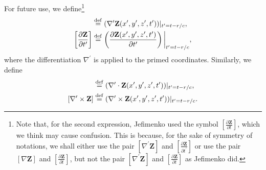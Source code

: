 \documentclass[11pt]{article}              %
\begin{document}
For future use, we define\footnote{Note that, for the second expression, Jefimenko used the symbol $\left[\frac{\partial{\mathbf Z}}{\partial t}\right]$, which we think may cause confusion. This is because, for the sake of symmetry of notations, we shall either use the pair $[\nabla^\prime {\mathbf Z}]$ and  $\left[\frac{\partial{\mathbf Z}}{\partial t^\prime}\right]$ or use the pair $[\nabla{\mathbf Z}]$ and  $\left[\frac{\partial{\mathbf Z}}{\partial t}\right]$, but not the pair $[\nabla^\prime {\mathbf Z}]$ and  $\left[\frac{\partial{\mathbf Z}}{\partial t}\right]$ as Jefimenko did.}
\begin{align}
    [\nabla^\prime {\mathbf Z}]&\stackrel{\operatorname{def}}{=}(\nabla^\prime{\mathbf Z}(x^\prime,y^\prime,z^\prime,t^\prime))|_{t^\prime=t-r/c},\notag\\
    \left[\frac{\partial{\mathbf Z}}{\partial t^\prime}\right] &\stackrel{\operatorname{def}}{=}\left(\frac{\partial{\mathbf Z} (x^\prime,y^\prime,z^\prime,t^\prime)}{\partial t^\prime}\right)\bigg\rvert_{t^\prime=t-r/c},\notag
\end{align}
where the differentiation $\nabla^\prime$ is applied to the primed coordinates. Similarly, we define
\begin{align}
    [\nabla^\prime \cdot {\mathbf Z}]&\stackrel{\operatorname{def}}{=}(\nabla^\prime\cdot {\mathbf Z}(x^\prime,y^\prime,z^\prime,t^\prime))|_{t^\prime=t-r/c},\notag\\
    [\nabla^\prime \times {\mathbf Z}]&\stackrel{\operatorname{def}}{=}(\nabla^\prime\times{\mathbf Z}(x^\prime,y^\prime,z^\prime,t^\prime))|_{t^\prime=t-r/c}.\notag
\end{align}

\end{document}

